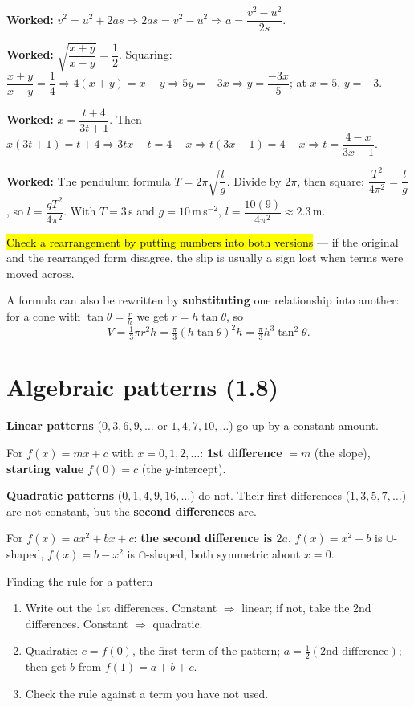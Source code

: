 \documentclass[11pt]{article}
\newcommand{\key}[1]{\hl{#1}}
\newcommand{\keyin}[1]{\textbf{\color{lilacdeep}#1}}  %
\newcommand{\wex}[1]{\textbf{\color{lilacdeep}Worked:} #1}
\begin{document}
\wex{$v^{2}=u^{2}+2as\Rightarrow 2as=v^{2}-u^{2}\Rightarrow a=\dfrac{v^{2}-u^{2}}{2s}$.}

\wex{$\sqrt{\dfrac{x+y}{x-y}}=\dfrac12$. Squaring: $\dfrac{x+y}{x-y}=\dfrac14\Rightarrow4(x+y)=x-y\Rightarrow5y=-3x\Rightarrow y=\dfrac{-3x}{5}$; at $x=5$, $y=-3$.}

\wex{$x=\dfrac{t+4}{3t+1}$. Then $x(3t+1)=t+4\Rightarrow3tx-t=4-x\Rightarrow t(3x-1)=4-x\Rightarrow t=\dfrac{4-x}{3x-1}$.}

\wex{The pendulum formula $T=2\pi\sqrt{\dfrac lg}$. Divide by $2\pi$, then square: $\dfrac{T^{2}}{4\pi^{2}}=\dfrac lg$, so $l=\dfrac{gT^{2}}{4\pi^{2}}$. With $T=3$\,s and $g=10$\,m\,s$^{-2}$, $l=\dfrac{10(9)}{4\pi^{2}}\approx2.3$\,m.}

\key{Check a rearrangement by putting numbers into both versions} --- if the original and the rearranged form disagree, the slip is usually a sign lost when terms were moved across.

A formula can also be rewritten by \textbf{substituting} one relationship into another: for a cone with $\tan\theta=\frac rh$ we get $r=h\tan\theta$, so
\[V=\tfrac13\pi r^{2}h=\tfrac{\pi}{3}(h\tan\theta)^{2}h=\tfrac{\pi}{3}h^{3}\tan^{2}\theta .\]

\section{Algebraic patterns (1.8)}

\textbf{Linear patterns} ($0,3,6,9,\dots$ or $1,4,7,10,\dots$) go up by a constant amount.

\begin{formulabox}
For $f(x)=mx+c$ with $x=0,1,2,\dots$: \quad
\textbf{1st difference} $=m$ (the slope), \quad \textbf{starting value} $f(0)=c$ (the $y$-intercept).
\end{formulabox}

\textbf{Quadratic patterns} ($0,1,4,9,16,\dots$) do not. Their first differences ($1,3,5,7,\dots$) are not constant, but the \textbf{second differences} are.

\begin{formulabox}
For $f(x)=ax^{2}+bx+c$: \quad \keyin{the second difference is \mbox{$2a$}}. \quad
$f(x)=x^{2}+b$ is $\cup$-shaped, $f(x)=b-x^{2}$ is $\cap$-shaped, both symmetric about $x=0$.
\end{formulabox}

\begin{methodbox}{Finding the rule for a pattern}
\begin{enumerate}[topsep=1pt,itemsep=0pt,leftmargin=*]
\item Write out the 1st differences. Constant $\Rightarrow$ linear; if not, take the 2nd differences. Constant $\Rightarrow$ quadratic.
\item Quadratic: $c=f(0)$, the first term of the pattern; $a=\tfrac12(\text{2nd difference})$; then get $b$ from $f(1)=a+b+c$.
\item Check the rule against a term you have not used.
\end{enumerate}
\end{methodbox}
\end{document}
